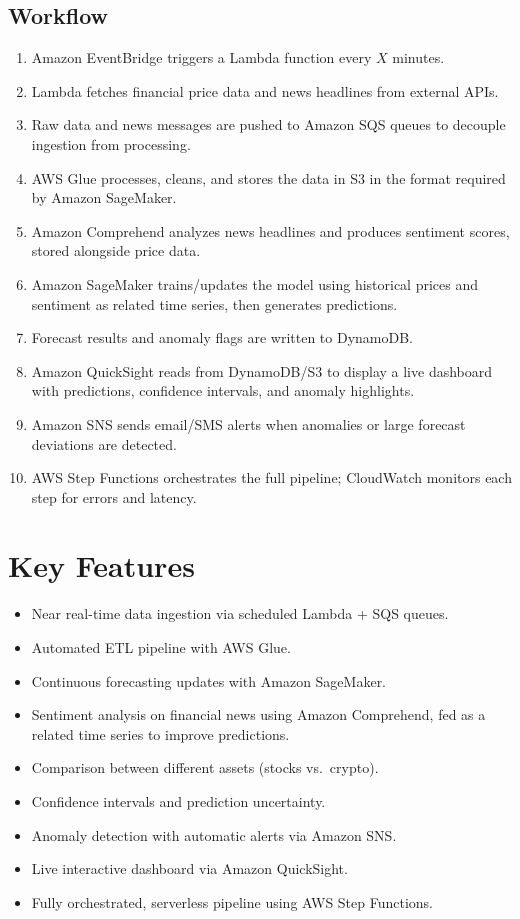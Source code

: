 \documentclass[a4paper,12pt]{article}
\begin{document}
\subsection{Workflow}
\begin{enumerate}[leftmargin=1.4em]
    \item Amazon EventBridge triggers a Lambda function every $X$ minutes.
    \item Lambda fetches financial price data and news headlines from external APIs.
    \item Raw data and news messages are pushed to Amazon SQS queues to decouple ingestion from processing.
    \item AWS Glue processes, cleans, and stores the data in S3 in the format required by Amazon SageMaker.
    \item Amazon Comprehend analyzes news headlines and produces sentiment scores, stored alongside price data.
    \item Amazon SageMaker trains/updates the model using historical prices and sentiment as related time series, then generates predictions.
    \item Forecast results and anomaly flags are written to DynamoDB.
    \item Amazon QuickSight reads from DynamoDB/S3 to display a live dashboard with predictions, confidence intervals, and anomaly highlights.
    \item Amazon SNS sends email/SMS alerts when anomalies or large forecast deviations are detected.
    \item AWS Step Functions orchestrates the full pipeline; CloudWatch monitors each step for errors and latency.
\end{enumerate}

\section{Key Features}
\begin{itemize}[leftmargin=1.2em]
    \item Near real-time data ingestion via scheduled Lambda + SQS queues.
    \item Automated ETL pipeline with AWS Glue.
    \item Continuous forecasting updates with Amazon SageMaker.
    \item Sentiment analysis on financial news using Amazon Comprehend, fed as a related time series to improve predictions.
    \item Comparison between different assets (stocks vs.\ crypto).
    \item Confidence intervals and prediction uncertainty.
    \item Anomaly detection with automatic alerts via Amazon SNS.
    \item Live interactive dashboard via Amazon QuickSight.
    \item Fully orchestrated, serverless pipeline using AWS Step Functions.
\end{itemize}
\end{document}
